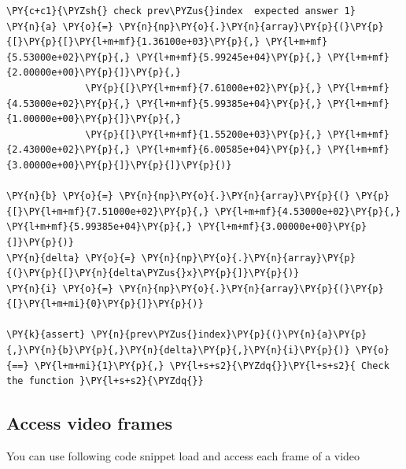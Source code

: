 \documentclass[a4paper,11pt]{article}%
\begin{document}
    \begin{tcolorbox}[breakable, size=fbox, boxrule=1pt, pad at break*=1mm,colback=cellbackground, colframe=cellborder]
\begin{Verbatim}[commandchars=\\\{\}]
\PY{c+c1}{\PYZsh{} check prev\PYZus{}index  expected answer 1}
\PY{n}{a} \PY{o}{=} \PY{n}{np}\PY{o}{.}\PY{n}{array}\PY{p}{(}\PY{p}{[}\PY{p}{[}\PY{l+m+mf}{1.36100e+03}\PY{p}{,} \PY{l+m+mf}{5.53000e+02}\PY{p}{,} \PY{l+m+mf}{5.99245e+04}\PY{p}{,} \PY{l+m+mf}{2.00000e+00}\PY{p}{]}\PY{p}{,}
              \PY{p}{[}\PY{l+m+mf}{7.61000e+02}\PY{p}{,} \PY{l+m+mf}{4.53000e+02}\PY{p}{,} \PY{l+m+mf}{5.99385e+04}\PY{p}{,} \PY{l+m+mf}{1.00000e+00}\PY{p}{]}\PY{p}{,}
              \PY{p}{[}\PY{l+m+mf}{1.55200e+03}\PY{p}{,} \PY{l+m+mf}{2.43000e+02}\PY{p}{,} \PY{l+m+mf}{6.00585e+04}\PY{p}{,} \PY{l+m+mf}{3.00000e+00}\PY{p}{]}\PY{p}{]}\PY{p}{)}

\PY{n}{b} \PY{o}{=} \PY{n}{np}\PY{o}{.}\PY{n}{array}\PY{p}{(} \PY{p}{[}\PY{l+m+mf}{7.51000e+02}\PY{p}{,} \PY{l+m+mf}{4.53000e+02}\PY{p}{,} \PY{l+m+mf}{5.99385e+04}\PY{p}{,} \PY{l+m+mf}{3.00000e+00}\PY{p}{]}\PY{p}{)}
\PY{n}{delta} \PY{o}{=} \PY{n}{np}\PY{o}{.}\PY{n}{array}\PY{p}{(}\PY{p}{[}\PY{n}{delta\PYZus{}x}\PY{p}{]}\PY{p}{)}
\PY{n}{i} \PY{o}{=} \PY{n}{np}\PY{o}{.}\PY{n}{array}\PY{p}{(}\PY{p}{[}\PY{l+m+mi}{0}\PY{p}{]}\PY{p}{)}

\PY{k}{assert} \PY{n}{prev\PYZus{}index}\PY{p}{(}\PY{n}{a}\PY{p}{,}\PY{n}{b}\PY{p}{,}\PY{n}{delta}\PY{p}{,}\PY{n}{i}\PY{p}{)} \PY{o}{==} \PY{l+m+mi}{1}\PY{p}{,} \PY{l+s+s2}{\PYZdq{}}\PY{l+s+s2}{ Check the function }\PY{l+s+s2}{\PYZdq{}}
\end{Verbatim}
\end{tcolorbox}
\pagebreak
    \hypertarget{access-video-frames}{%
\subsection{Access video frames}\label{access-video-frames}}

You can use following code snippet load and access each frame of a video
\end{document}

